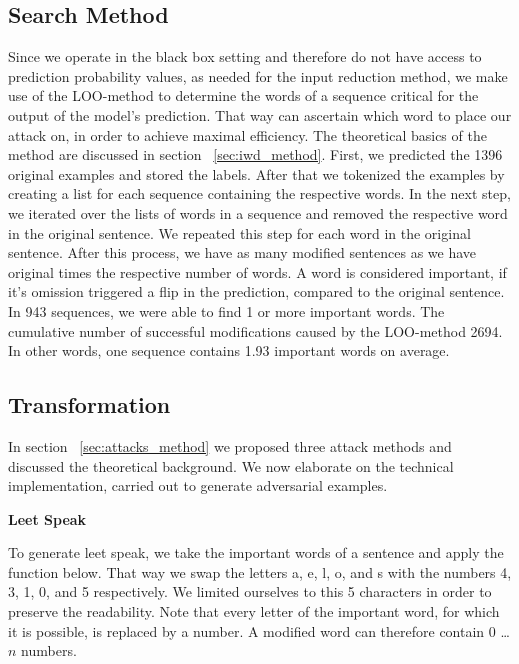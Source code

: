 \subsection{Search Method}
\label{sec:search_method_m}
Since we operate in the black box setting and therefore do not have access to prediction probability values, as needed for the input reduction method, we make use of the LOO-method to determine the words of a sequence critical for the output of the model's prediction. That way can ascertain which word to place our attack on, in order to achieve maximal efficiency. The theoretical basics of the method are discussed in section ~\ref{sec:iwd_method}.
First, we predicted the 1396 original examples and stored the labels. After that we tokenized the examples by creating a list for each sequence containing the respective words. In the next step, we iterated over the lists of words in a sequence and removed the respective word in the original sentence. We repeated this step for each word in the original sentence. 
After this process, we have as many modified sentences as we have original times the respective number of words. A word is considered important, if it's omission triggered a flip in the prediction, compared to the original sentence. 
In 943 sequences, we were able to find 1 or more important words. The cumulative number of successful modifications caused by the LOO-method 2694. In other words, one sequence contains 1.93 important words on average.

\subsection{Transformation}
\label{sec:transformation_m}
In section ~\ref{sec:attacks_method} we proposed three attack methods and discussed the theoretical background. We now elaborate on the technical implementation, carried out to generate adversarial examples.

\textbf{Leet Speak}

To generate leet speak, we take the important words of a sentence and apply the function below. That way we swap the letters a, e, l, o, and s with the numbers 4, 3, 1, 0, and 5 respectively. We limited ourselves to this 5 characters in order to preserve the readability. Note that every letter of the important word, for which it is possible, is replaced by a number. A modified word can therefore contain $0$ \dots $n$ numbers.

